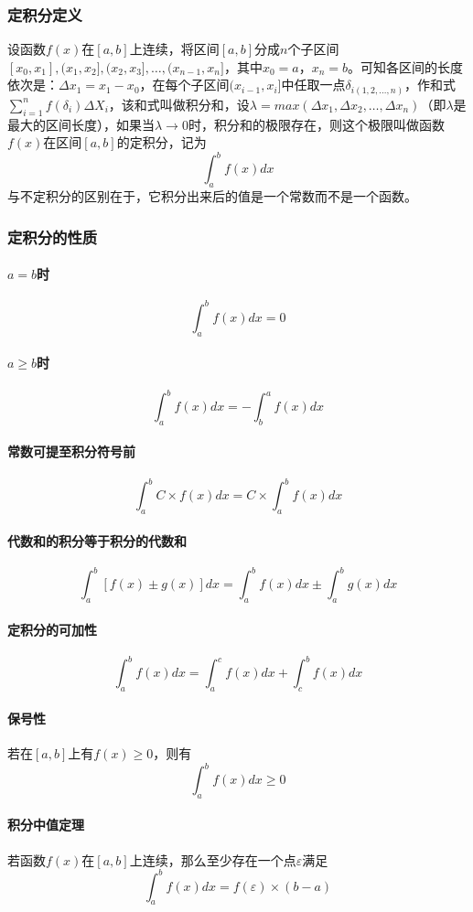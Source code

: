 \documentclass[UTF-8]{ctexart}
\begin{document}
	\subsubsection{定积分定义}
	设函数$f(x)$在$[a,b]$上连续，将区间$[a,b]$分成$n$个子区间$[x _ 0,x _ 1], (x _ 1,x _ 2], (x _ 2,x _ 3], …, (x _ {n-1},x _ n]$，其中$x _ 0=a，x _ n=b$。可知各区间的长度依次是：$\Delta x _ 1=x _ 1-x _ 0$，在每个子区间$(x _ {i-1},x _ i]$中任取一点$\delta  _ {i(1,2,...,n)}$，作和式$\sum _ {i=1}^{n}f(\delta _ i) \Delta X _ i$，该和式叫做积分和，设$\lambda=max(\Delta x _ 1, \Delta x _ 2, …, \Delta x _ n)$（即$\lambda$是最大的区间长度），如果当$\lambda→0$时，积分和的极限存在，则这个极限叫做函数$f(x)$在区间$[a,b]$的定积分，记为  
	$$\int _ {a}^{b} f(x)dx$$  
	与不定积分的区别在于，它积分出来后的值是一个常数而不是一个函数。
	\subsubsection{定积分的性质}
	\paragraph{$a=b$时} $$\int _ a^b f(x)dx=0$$
	\paragraph{$a \ge b$时} $$\int _ a^b f(x)dx=-\int _ b^a f(x)dx$$
	\paragraph{常数可提至积分符号前}$$\int _ a^b C \times f(x)dx=C \times \int _ a^b f(x)dx$$
	\paragraph{代数和的积分等于积分的代数和}$$\int _ a^b [f(x)\pm g(x)]dx=\int _ a^b f(x)dx\pm\int _ a^b g(x)dx$$
	\paragraph{定积分的可加性}
	$$\int _ a^b f(x)dx=\int _ a^c f(x)dx+\int _ c^b f(x)dx$$
	\paragraph{保号性}
	若在$[a,b]$上有$f(x) \ge 0$，则有$$\int _ a^b f(x)dx \ge 0$$
	\paragraph{积分中值定理}若函数$f(x)$在$[a,b]$上连续，那么至少存在一个点$\varepsilon$满足$$\int _ a^b f(x)dx=f(\varepsilon) \times (b-a)$$
\end{document}
